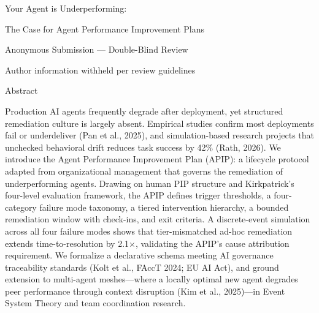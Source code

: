 Your Agent is Underperforming:

The Case for Agent Performance Improvement Plans

Anonymous Submission --- Double-Blind Review

Author information withheld per review guidelines

Abstract

Production AI agents frequently degrade after deployment, yet structured remediation culture is largely absent. Empirical studies confirm most deployments fail or underdeliver (Pan et al., 2025), and simulation-based research projects that unchecked behavioral drift reduces task success by 42\% (Rath, 2026). We introduce the Agent Performance Improvement Plan (APIP): a lifecycle protocol adapted from organizational management that governs the remediation of underperforming agents. Drawing on human PIP structure and Kirkpatrick's four-level evaluation framework, the APIP defines trigger thresholds, a four-category failure mode taxonomy, a tiered intervention hierarchy, a bounded remediation window with check-ins, and exit criteria. A discrete-event simulation across all four failure modes shows that tier-mismatched ad-hoc remediation extends time-to-resolution by 2.1$\times$, validating the APIP's cause attribution requirement. We formalize a declarative schema meeting AI governance traceability standards (Kolt et al., FAccT 2024; EU AI Act), and ground extension to multi-agent meshes---where a locally optimal new agent degrades peer performance through context disruption (Kim et al., 2025)---in Event System Theory and team coordination research.

